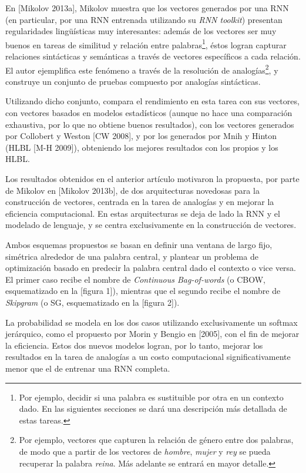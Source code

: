 En [Mikolov 2013a], Mikolov muestra que los vectores generados por una RNN (en particular, por una
RNN entrenada utilizando su \textit{RNN toolkit}) presentan regularidades lingüísticas muy
interesantes: además de los vectores ser muy buenos en tareas de similitud y relación entre
palabras\footnote{Por ejemplo, decidir si una palabra es sustituible por otra en un contexto
dado. En las siguientes secciones se dará una descripción más detallada de estas tareas.}, éstos
logran capturar relaciones sintácticas y semánticas a través de vectores específicos a cada
relación. El autor ejemplifica este fenómeno a través de la resolución de analogías\footnote{Por
ejemplo, vectores que capturen la relación de género entre dos palabras, de modo que a partir de los
vectores de \textit{hombre}, \textit{mujer} y \textit{rey} se pueda recuperar la palabra
\textit{reina}. Más adelante se entrará en mayor detalle.}, y construye un conjunto de pruebas
compuesto por analogías sintácticas.

Utilizando dicho conjunto, compara el rendimiento en esta tarea con sus vectores, con vectores
basados en modelos estadísticos (aunque no hace una comparación exhaustiva, por lo que no obtiene
buenos resultados), con los vectores generados por Collobert y Weston [CW 2008], y por los generados
por Mnih y Hinton (HLBL [M-H 2009]), obteniendo los mejores resultados con los propios y los HLBL\@.

Los resultados obtenidos en el anterior artículo motivaron la propuesta, por parte de Mikolov en
[Mikolov 2013b], de dos arquitecturas novedosas para la construcción de vectores, centrada en la
tarea de analogías y en mejorar la eficiencia computacional. En estas arquitecturas se deja de lado
la RNN y el modelado de lenguaje, y se centra exclusivamente en la construcción de vectores.

Ambos esquemas propuestos se basan en definir una ventana de largo fijo, simétrica alrededor de una
palabra central, y plantear un problema de optimización basado en predecir la palabra central dado
el contexto o vice versa. El primer caso recibe el nombre de \textit{Continuous Bag-of-words} (o
CBOW, esquematizado en la [figura 1]), mientras que el segundo recibe el nombre de \textit{Skipgram}
(o SG, esquematizado en la [figura 2]).

La probabilidad se modela en los dos casos utilizando exclusivamente un softmax jerárquico, como el
propuesto por Morin y Bengio en [2005], con el fin de mejorar la eficiencia. Estos dos nuevos
modelos logran, por lo tanto, mejorar los resultados en la tarea de analogías a un costo
computacional significativamente menor que el de entrenar una RNN completa.

